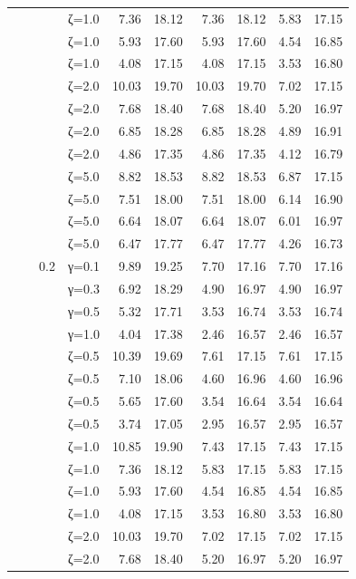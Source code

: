 \begin{table}[htbp]
\begin{tabular}{ll r l  rr  rr  rr}
  &  &  & ζ=1.0 & 7.36 & 18.12 & 7.36 & 18.12 & 5.83 & 17.15 \\
  &  &  & ζ=1.0 & 5.93 & 17.60 & 5.93 & 17.60 & 4.54 & 16.85 \\
  &  &  & ζ=1.0 & 4.08 & 17.15 & 4.08 & 17.15 & 3.53 & 16.80 \\
  &  &  & ζ=2.0 & 10.03 & 19.70 & 10.03 & 19.70 & 7.02 & 17.15 \\
  &  &  & ζ=2.0 & 7.68 & 18.40 & 7.68 & 18.40 & 5.20 & 16.97 \\
  &  &  & ζ=2.0 & 6.85 & 18.28 & 6.85 & 18.28 & 4.89 & 16.91 \\
  &  &  & ζ=2.0 & 4.86 & 17.35 & 4.86 & 17.35 & 4.12 & 16.79 \\
  &  &  & ζ=5.0 & 8.82 & 18.53 & 8.82 & 18.53 & 6.87 & 17.15 \\
  &  &  & ζ=5.0 & 7.51 & 18.00 & 7.51 & 18.00 & 6.14 & 16.90 \\
  &  &  & ζ=5.0 & 6.64 & 18.07 & 6.64 & 18.07 & 6.01 & 16.97 \\
  &  &  & ζ=5.0 & 6.47 & 17.77 & 6.47 & 17.77 & 4.26 & 16.73 \\
  &  & 0.2 & γ=0.1 & 9.89 & 19.25 & 7.70 & 17.16 & 7.70 & 17.16 \\
  &  &  & γ=0.3 & 6.92 & 18.29 & 4.90 & 16.97 & 4.90 & 16.97 \\
  &  &  & γ=0.5 & 5.32 & 17.71 & 3.53 & 16.74 & 3.53 & 16.74 \\
  &  &  & γ=1.0 & 4.04 & 17.38 & 2.46 & 16.57 & 2.46 & 16.57 \\
  &  &  & ζ=0.5 & 10.39 & 19.69 & 7.61 & 17.15 & 7.61 & 17.15 \\
  &  &  & ζ=0.5 & 7.10 & 18.06 & 4.60 & 16.96 & 4.60 & 16.96 \\
  &  &  & ζ=0.5 & 5.65 & 17.60 & 3.54 & 16.64 & 3.54 & 16.64 \\
  &  &  & ζ=0.5 & 3.74 & 17.05 & 2.95 & 16.57 & 2.95 & 16.57 \\
  &  &  & ζ=1.0 & 10.85 & 19.90 & 7.43 & 17.15 & 7.43 & 17.15 \\
  &  &  & ζ=1.0 & 7.36 & 18.12 & 5.83 & 17.15 & 5.83 & 17.15 \\
  &  &  & ζ=1.0 & 5.93 & 17.60 & 4.54 & 16.85 & 4.54 & 16.85 \\
  &  &  & ζ=1.0 & 4.08 & 17.15 & 3.53 & 16.80 & 3.53 & 16.80 \\
  &  &  & ζ=2.0 & 10.03 & 19.70 & 7.02 & 17.15 & 7.02 & 17.15 \\
  &  &  & ζ=2.0 & 7.68 & 18.40 & 5.20 & 16.97 & 5.20 & 16.97 \\

\end{tabular}
\end{table}
